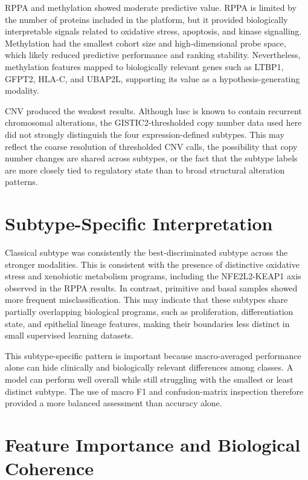 RPPA and methylation showed moderate predictive value. RPPA is limited by the number of proteins included in the platform, but it provided biologically interpretable signals related to oxidative stress, apoptosis, and kinase signalling. Methylation had the smallest cohort size and high-dimensional probe space, which likely reduced predictive performance and ranking stability. Nevertheless, methylation features mapped to biologically relevant genes such as LTBP1, GFPT2, HLA-C, and UBAP2L, supporting its value as a hypothesis-generating modality.

CNV produced the weakest results. Although \gls{lusc} is known to contain recurrent chromosomal alterations, the GISTIC2-thresholded copy number data used here did not strongly distinguish the four expression-defined subtypes. This may reflect the coarse resolution of thresholded CNV calls, the possibility that copy number changes are shared across subtypes, or the fact that the subtype labels are more closely tied to regulatory state than to broad structural alteration patterns.

\section{Subtype-Specific Interpretation}

Classical subtype was consistently the best-discriminated subtype across the stronger modalities. This is consistent with the presence of distinctive oxidative stress and xenobiotic metabolism programs, including the NFE2L2-KEAP1 axis observed in the RPPA results. In contrast, primitive and basal samples showed more frequent misclassification. This may indicate that these subtypes share partially overlapping biological programs, such as proliferation, differentiation state, and epithelial lineage features, making their boundaries less distinct in small supervised learning datasets.

This subtype-specific pattern is important because macro-averaged performance alone can hide clinically and biologically relevant differences among classes. A model can perform well overall while still struggling with the smallest or least distinct subtype. The use of macro F1 and confusion-matrix inspection therefore provided a more balanced assessment than accuracy alone.

\section{Feature Importance and Biological Coherence}

